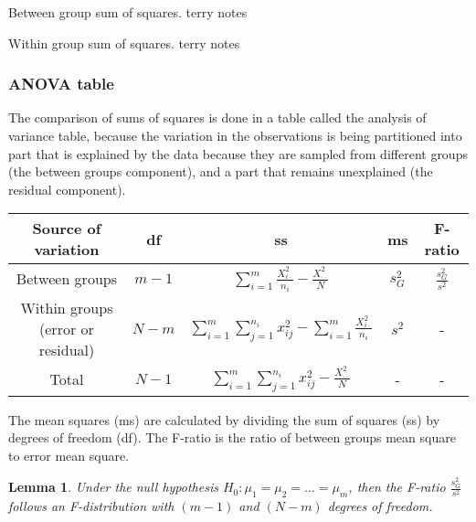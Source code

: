 \documentclass[12pt]{article}
\newtheorem{lemma}[theorem]{Lemma}
\begin{document}
\begin{mdframed}
Between group sum of squares.
\textcolor[rgb]{1.00,1.00,1.00}{terry notes\lipsum[1-6]}
\end{mdframed}

\begin{mdframed}
Within group sum of squares.
\textcolor[rgb]{1.00,1.00,1.00}{terry notes\lipsum[1-6]}
\end{mdframed}

\subsubsection{ANOVA table}
The comparison of sums of squares is done in a table called the analysis of variance table, because the variation in the observations is being partitioned into part that is explained by the data because they are sampled from different groups (the between groups component), and a part that remains unexplained (the residual component).

\begin{center}
\begin{tabular}{|c|c|c|c|c|}
  \hline
  Source of variation & df & ss & ms & F-ratio \\ [20pt]\hline
  Between groups & $m-1$ & $\displaystyle \sum_{i=1}^{m}\frac{X_{i\cdot}^{2}}{n_{i}}-\frac{X_{\cdot\cdot}^{2}}{N}$ & $s_{G}^{2}$ & $\displaystyle \frac{s_{G}^{2}}{s^{2}}$ \\[20pt] \hline
  Within groups (error or residual) & $N-m$ & $\displaystyle  \sum_{i=1}^{m}\sum_{j=1}^{n_{i}}x_{ij}^{2}-\sum_{i=1}^{m}\frac{X_{i\cdot}^{2}}{n_{i}}$ & $s^{2}$ & - \\[20pt] \hline
  Total & $N-1$ & $\displaystyle \sum_{i=1}^{m}\sum_{j=1}^{n_{i}}x_{ij}^{2}-\frac{X_{\cdot\cdot}^2}{N}$ & - & - \\[20pt]
  \hline
\end{tabular}
\end{center}


The mean squares (ms) are calculated by dividing the sum of squares (ss) by degrees of freedom (df). The F-ratio is the ratio of between groups mean square to error mean square.

\begin{lemma}
Under the null hypothesis $H_{0}: \mu_{1}=\mu_{2}=\ldots=\mu_{m}$, then the F-ratio $\displaystyle \frac{s_{G}^{2}}{s^{2}}$ follows an F-distribution with $(m - 1)$ and $(N - m)$ degrees of freedom.
\end{lemma}
\end{document}
